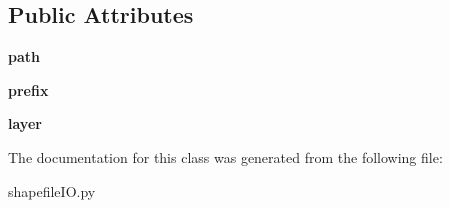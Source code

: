 \subsection*{Public Attributes}
\begin{DoxyCompactItemize}
\item 
\hypertarget{class_sim_g_d_c_1_1shapefile_i_o_1_1_shapefile_writer_abc6abdc5df2337cf780c89b321147f0b}{}{\bfseries path}\label{class_sim_g_d_c_1_1shapefile_i_o_1_1_shapefile_writer_abc6abdc5df2337cf780c89b321147f0b}

\item 
\hypertarget{class_sim_g_d_c_1_1shapefile_i_o_1_1_shapefile_writer_a69867510e31dc606dc77ce7625711ed1}{}{\bfseries prefix}\label{class_sim_g_d_c_1_1shapefile_i_o_1_1_shapefile_writer_a69867510e31dc606dc77ce7625711ed1}

\item 
\hypertarget{class_sim_g_d_c_1_1shapefile_i_o_1_1_shapefile_writer_ab159e320c98d6f9ff46e280a24472743}{}{\bfseries layer}\label{class_sim_g_d_c_1_1shapefile_i_o_1_1_shapefile_writer_ab159e320c98d6f9ff46e280a24472743}

\end{DoxyCompactItemize}


The documentation for this class was generated from the following file\+:\begin{DoxyCompactItemize}
\item 
shapefile\+I\+O.\+py\end{DoxyCompactItemize}
